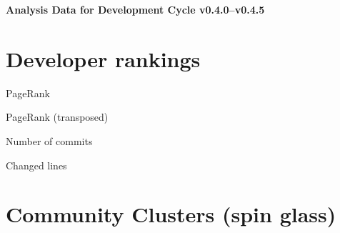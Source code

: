 \documentclass{article}
\begin{document}
\setlength{\parindent}{0pt}
\begin{center}
\begin{Large}
\textbf{Analysis Data for Development Cycle v0.4.0--v0.4.5}
\end{Large}
\end{center}
\section{Developer rankings}
\begin{small}\renewcommand{\tabcolsep}{1pt}
\begin{minipage}{0.5\linewidth}
PageRank\\

\end{minipage}%
\begin{minipage}{0.5\linewidth}
PageRank (transposed)\\

\end{minipage}

\renewcommand{\tabcolsep}{5pt}
\begin{minipage}{0.5\linewidth}
Number of commits\\

\end{minipage}%
\begin{minipage}{0.5\linewidth}
Changed lines\\

\end{minipage}
\end{small}
\newpage\section{Community Clusters (spin glass)}
\end{document}
